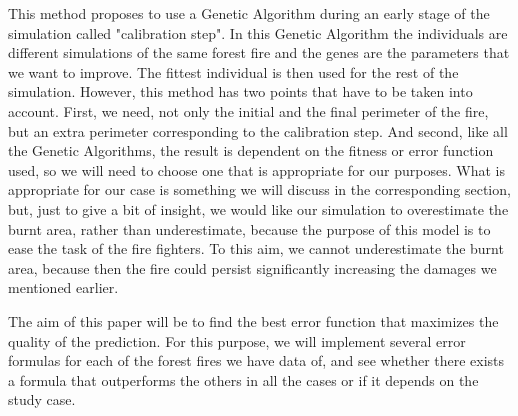 This method proposes to use a Genetic Algorithm during an early stage of the simulation called "calibration step". In this Genetic Algorithm the individuals are different simulations of the same forest fire and the genes are the parameters that we want to improve. The fittest individual is then used for the rest of the simulation. However, this method has two points that have to be taken into account. First, we need, not only the initial and the final perimeter of the fire, but an extra perimeter corresponding to the calibration step. And second, like all the Genetic Algorithms, the result is dependent on the fitness or error function used, so we will need to choose one that is appropriate for our purposes. What is appropriate for our case is something we will discuss in the corresponding section, but, just to give a bit of insight, we would like our simulation to overestimate the burnt area, rather than underestimate, because the purpose of this model is to ease the task of the fire fighters. To this aim, we cannot underestimate the burnt area, because then the fire could persist significantly increasing the damages we mentioned earlier.

The aim of this paper will be to find the best error function that maximizes the quality of the prediction. For this purpose, we will implement several error formulas for each of the forest fires we have data of, and see whether there exists a formula that outperforms the others in all the cases or if it depends on the study case.

